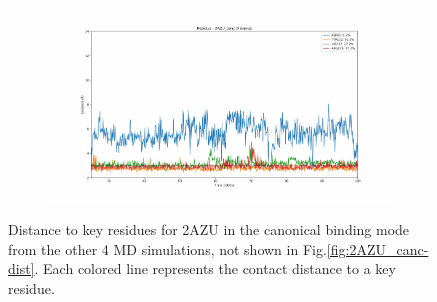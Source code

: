 \begin{figure}[!ht]
\begin{subfigure}{.45\textwidth}
  \end{subfigure}
    \begin{subfigure}{.45\textwidth}
     \centering
     \includegraphics[width=.95\linewidth]{chapter4/2AZU_canc/2AZU_canc-dist_3.pdf}
  \end{subfigure}
\caption[Key residues distances for $2AZU_{canc}$]{Distance to key residues for 2AZU in the canonical binding mode from the other 4 MD simulations, not shown in Fig.\ref{fig:2AZU_canc-dist}. Each colored line represents the contact distance to a key residue.}
\label{sup:2AZU_canc-dist}
\end{figure}  

